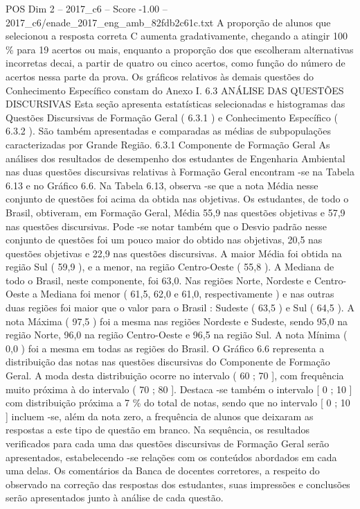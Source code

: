 \begin{textsample}{POS Dim 2 – 2017\_c6 – Score -1.00 – 2017\_c6/enade\_2017\_eng\_amb\_82fdb2c61c.txt}
A proporção de alunos que selecionou a resposta correta C aumenta gradativamente, chegando a atingir 100 \% para 19 acertos ou mais, enquanto a proporção dos que escolheram alternativas incorretas decai, a partir de quatro ou cinco acertos, como função do número de acertos nessa parte da prova.
Os gráficos relativos às demais questões do Conhecimento Específico constam do Anexo I. 6.3 ANÁLISE DAS QUESTÕES DISCURSIVAS Esta seção apresenta estatísticas selecionadas e histogramas das Questões Discursivas de Formação Geral ( 6.3.1 ) e Conhecimento Específico ( 6.3.2 ).
São também apresentadas e comparadas as médias de subpopulações caracterizadas por Grande Região. 6.3.1 Componente de Formação Geral As análises dos resultados de desempenho dos estudantes de Engenharia Ambiental nas duas questões discursivas relativas à Formação Geral encontram -se na Tabela 6.13 e no Gráfico 6.6.
Na Tabela 6.13, observa -se que a nota Média nesse conjunto de questões foi acima da obtida nas objetivas.
Os estudantes, de todo o Brasil, obtiveram, em Formação Geral, Média 55,9 nas questões objetivas e 57,9 nas questões discursivas.
Pode -se notar também que o Desvio padrão nesse conjunto de questões foi um pouco maior do obtido nas objetivas, 20,5 nas questões objetivas e 22,9 nas questões discursivas.
A maior Média foi obtida na região Sul ( 59,9 ), e a menor, na região Centro-Oeste ( 55,8 ).
A Mediana de todo o Brasil, neste componente, foi 63,0.
Nas regiões Norte, Nordeste e Centro-Oeste a Mediana foi menor ( 61,5, 62,0 e 61,0, respectivamente ) e nas outras duas regiões foi maior que o valor para o Brasil : Sudeste ( 63,5 ) e Sul ( 64,5 ).
A nota Máxima ( 97,5 ) foi a mesma nas regiões Nordeste e Sudeste, sendo 95,0 na região Norte, 96,0 na região Centro-Oeste e 96,5 na região Sul.
A nota Mínima ( 0,0 ) foi a mesma em todas as regiões do Brasil.
O Gráfico 6.6 representa a distribuição das notas nas questões discursivas do Componente de Formação Geral.
A moda desta distribuição ocorre no intervalo ( 60 ; 70 ], com frequência muito próxima à do intervalo ( 70 ; 80 ].
Destaca -se também o intervalo [ 0 ; 10 ] com distribuição próxima a 7 \% do total de notas, sendo que no intervalo [ 0 ; 10 ] incluem -se, além da nota zero, a frequência de alunos que deixaram as respostas a este tipo de questão em branco.
Na sequência, os resultados verificados para cada uma das questões discursivas de Formação Geral serão apresentados, estabelecendo -se relações com os conteúdos abordados em cada uma delas.
Os comentários da Banca de docentes corretores, a respeito do observado na correção das respostas dos estudantes, suas impressões e conclusões serão apresentados junto à análise de cada questão.

\end{textsample}
